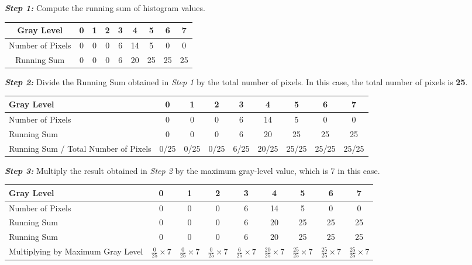 \textbf\textit{Step 1:} Compute the running sum of histogram values.

\begin{table*}[h!]
    \centering
    \begin{tabular}{|c|c|c|c|c|c|c|c|c|}
        \hline
        Gray Level & 0 & 1 & 2 & 3 & 4 & 5 & 6 & 7\\
        \hline
        Number of Pixels & 0 & 0 & 0 & 6 & 14 & 5 & 0 & 0\\
        \hline
        Running Sum & 0 & 0 & 0 & 6 & 20 & 25 & 25 & 25\\
        \hline
    \end{tabular}
\end{table*}

\textbf\textit{Step 2:} Divide the Running Sum obtained in \textit{Step 1} by the total number of pixels. In this case, the total number of pixels is \textbf{25}.

\begin{table*}[h]
    \centering
    \begin{tabular}{|p{4.5cm}|c|c|c|c|c|c|c|c|}
        \hline
        Gray Level & 0 & 1 & 2 & 3 & 4 & 5 & 6 & 7\\
        \hline
        Number of Pixels & 0 & 0 & 0 & 6 & 14 & 5 & 0 & 0\\
        \hline
        Running Sum & 0 & 0 & 0 & 6 & 20 & 25 & 25 & 25\\
        \hline
        Running Sum / Total Number of Pixels & 0/25 & 0/25 & 0/25 & 6/25 & 20/25 & 25/25 & 25/25 & 25/25\\
        \hline
    \end{tabular}
\end{table*}

\textbf\textit{Step 3:} Multiply the result obtained in \textit{Step 2} by the maximum gray-level value, which is 7 in this case.

\begin{table*}[h]
    \centering
    \begin{tabular}{|p{4cm}|c|c|c|c|c|c|c|c|}
        \hline
        Gray Level & 0 & 1 & 2 & 3 & 4 & 5 & 6 & 7\\
        \hline
        Number of Pixels & 0 & 0 & 0 & 6 & 14 & 5 & 0 & 0\\
        \hline
        Running Sum & 0 & 0 & 0 & 6 & 20 & 25 & 25 & 25\\
        \hline
        Running Sum & 0 & 0 & 0 & 6 & 20 & 25 & 25 & 25\\
        \hline
        Multiplying by Maximum Gray Level & $\frac{0}{25}\times 7$ & $\frac{0}{25}\times 7$ & $\frac{0}{25}\times 7$ & $\frac{6}{25}\times 7$ & $\frac{20}{25}\times 7$ & $\frac{25}{25}\times 7$ & $\frac{25}{25}\times 7$ & $\frac{25}{25}\times 7$\\
        \hline
    \end{tabular}
\end{table*}

